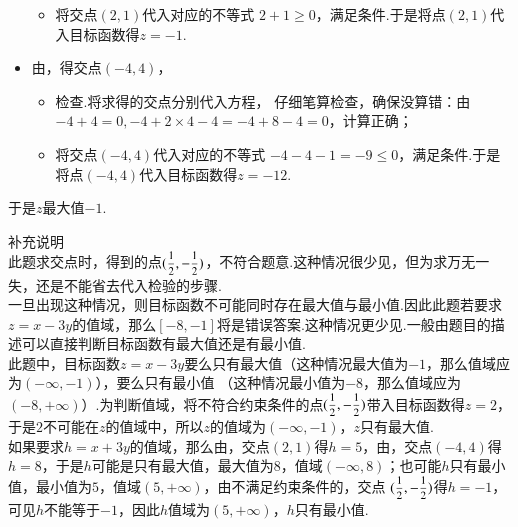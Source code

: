 \begin{exercise}
\begin{itemize}
\begin{itemize}
                \item 将交点$(2,1)$代入对应的不等式
                  $2+1\geqslant0$，满足条件.于是将点$(2,1)$代入目标函数得$z=-1$.
              \end{itemize}
            \item 由，得交点$(-4,4)$，
              \begin{itemize}
                \item 检查.{\kaishu 将求得的交点分别代入方程，
                  仔细笔算检查，确保没算错：由$-4+4=0,-4+2\times4-4=-4+8-4=0$，计算正确；}
                \item 将交点$(-4,4)$代入对应的不等式
                  $-4-4-1=-9\leqslant0$，满足条件.于是将点$(-4,4)$代入目标函数得$z=-12$.
              \end{itemize}
          \end{itemize}
          于是$z$最大值$-1$.
          \begin{framed}{\heiti 补充说明}\\
            此题求交点时，得到的点$(\mfrac12,-\mfrac12)$，不符合题意.{\kaishu 这种情况很少见，但为求万无一失，还是不能省去代入检验的步骤.}\\
            一旦出现这种情况，则目标函数不可能同时存在最大值与最小值.因此此题若要求$z=x-3y$的值域，那么$[-8,-1]$将是错误答案.{\kaishu 这种情况更少见.一般由题目的描述可以直接判断目标函数有最大值还是有最小值.}\\
            {\small 此题中，目标函数$z=x-3y$要么只有最大值（这种情况最大值为$-1$，那么值域应为$(-\infty,-1)$），要么只有最小值
              （这种情况最小值为$-8$，那么值域应为$(-8,+\infty)$）.为判断值域，将不符合约束条件的点$(\mfrac12,-\mfrac12)$带入目标函数得$z=2$，于是$2$不可能在$z$的值域中，所以$z$的值域为$(-\infty,-1)$，$z$只有最大值.\\
              如果要求$h=x+3y$的值域，那么由，交点$(2,1)$得$h=5$，由，交点$(-4,4)$得$h=8$，于是$h$可能是只有最大值，最大值为$8$，值域$(-\infty,8)$；也可能$h$只有最小值，最小值为$5$，值域$(5,+\infty)$，由不满足约束条件的，交点
              $(\mfrac12,-\mfrac12)$得$h=-1$，可见$h$不能等于$-1$，因此$h$值域为$(5,+\infty)$，$h$只有最小值.}
          \end{framed}
    \item %

\end{exercise}

